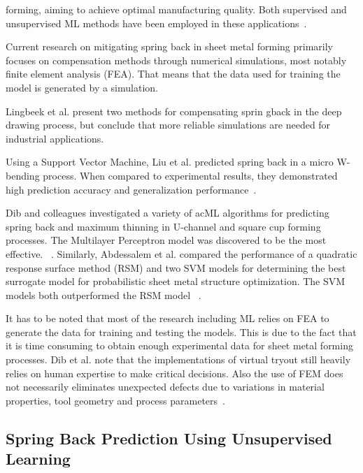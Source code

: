 forming, aiming to achieve optimal manufacturing quality. Both supervised and unsupervised \ac{ML} methods have been
employed in these applications~\cite[p. 2]{cruz_applicationmachinelearning_2021}.

Current research on mitigating spring back in sheet metal forming primarily focuses on compensation methods through
numerical simulations, most notably finite element analysis (FEA)\cite[p. 565]{liu2021deep}.
That means that the data used for training the model is generated by a simulation.

Lingbeek et al.\cite{lingbeek2005development} present two methods for compensating sprin gback in the deep
drawing process, but conclude that more reliable simulations are needed for industrial applications.

Using a Support Vector Machine, Liu et al. predicted spring back in a micro W-bending process. When compared to
experimental results, they demonstrated high prediction accuracy and generalization
performance~\cite[p. 1]{liu_springbackpredictionforming_2019}.

Dib and colleagues investigated a variety of acML algorithms for predicting spring back and maximum thinning in
U-channel and square cup forming processes. The Multilayer Perceptron model was discovered to be the most effective.
~\cite{dib_singleensembleclassifiers_2020}.
Similarly, Abdessalem et al. compared the performance of a quadratic response surface method (RSM) and two \ac{SVM}
models for determining the best surrogate model for probabilistic sheet metal structure optimization.
The \ac{SVM} models both outperformed the RSM model
~\cite[]{abdessalem2015probabilistic}.

It has to be noted that most of the research including \ac{ML} relies on FEA to generate the data for training and
testing the models.
This is due to the fact that it is time consuming to obtain enough experimental data for
sheet metal forming processes.
Dib et al. note that the implementations of virtual tryout still heavily relies on human expertise to make critical
decisions.
Also the use of FEM does not necessarily eliminates unexpected defects due to variations
in material properties, tool geometry and process parameters~\cite[p. 2]{dib_singleensembleclassifiers_2020}.

\subsection*{Spring Back Prediction Using Unsupervised Learning}

